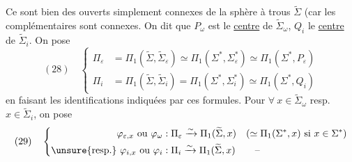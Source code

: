 Ce sont bien des ouverts  simplement connexes de la sphère à trous $\widetilde\Sigma$ (car les complémentaires  sont connexes. On dit que $P_\omega$ est le \uline{centre} de $\widetilde\Sigma_\omega$, $Q_i$ le \uline{centre} de $\widetilde\Sigma_i$.
On pose
\[
(28)\quad\left\{\begin{aligned}
\Pi_\varepsilon&=\Pi_1(\widetilde\Sigma,\widetilde\Sigma_\varepsilon)\simeq\Pi_1(\Sigma^*,\Sigma_\varepsilon^*)\simeq\Pi_1(\Sigma^*,P_\varepsilon)\\
\Pi_i&=\Pi_1(\widetilde\Sigma,\widetilde\Sigma_i)=\Pi_1(\Sigma^*,\Sigma_i^*)\simeq\Pi_1(\Sigma^*,Q_i)
\end{aligned}\right.
\]
en faisant les identifications indiquées par ces formules.  Pour $\forall\ x\in\widetilde\Sigma_\omega$ resp. $x\in\widetilde\Sigma_i$, on pose
\[
(29)\quad\left\{\begin{aligned}
\varphi_{\varepsilon,x}\text{ ou }\varphi_\omega&:\Pi_\varepsilon\xrightarrow{\sim}\Pi_1(\widetilde\Sigma,x)\quad(\simeq\Pi_1(\Sigma^*,x)\text{ si }x\in\Sigma^*)\\
\text{\unsure{resp.}}\ \varphi_{i,x}\text{ ou }\varphi_i&:\Pi_i\xrightarrow{\sim}\Pi_1(\widetilde\Sigma,x)\qquad\text{--}
\end{aligned}\right.
\]
